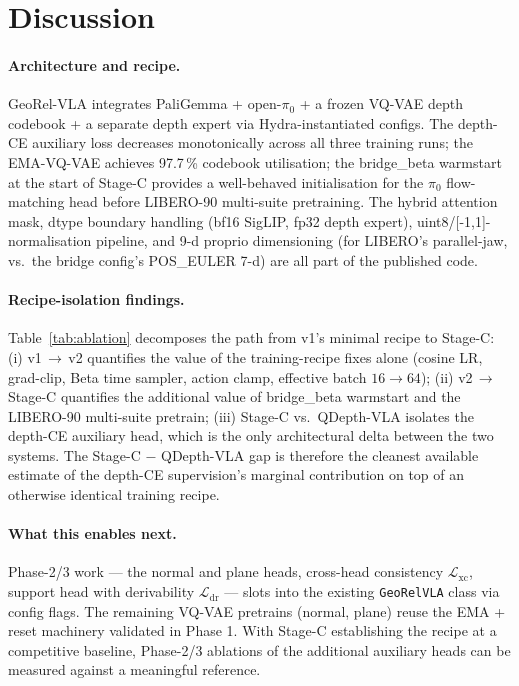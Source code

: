 \documentclass{article}
\newcommand{\Lxc}{\mathcal{L}_{\mathrm{xc}}}
\newcommand{\Ldr}{\mathcal{L}_{\mathrm{dr}}}
\begin{document}
\section{Discussion}\label{sec:discuss}

\paragraph{Architecture and recipe.} GeoRel-VLA integrates PaliGemma + open-$\pi_0$ + a frozen VQ-VAE depth codebook + a separate depth expert via Hydra-instantiated configs. The depth-CE auxiliary loss decreases monotonically across all three training runs; the EMA-VQ-VAE achieves 97.7\,\% codebook utilisation; the bridge\_beta warmstart at the start of Stage-C provides a well-behaved initialisation for the $\pi_0$ flow-matching head before LIBERO-90 multi-suite pretraining. The hybrid attention mask, dtype boundary handling (bf16 SigLIP, fp32 depth expert), uint8/[-1,1]-normalisation pipeline, and 9-d proprio dimensioning (for LIBERO's parallel-jaw, vs.\ the bridge config's POS\_EULER 7-d) are all part of the published code.

\paragraph{Recipe-isolation findings.} Table~\ref{tab:ablation} decomposes the path from v1's minimal recipe to Stage-C: (i) v1\,$\to$\,v2 quantifies the value of the training-recipe fixes alone (cosine LR, grad-clip, Beta time sampler, action clamp, effective batch $16{\to}64$); (ii) v2\,$\to$\,Stage-C quantifies the additional value of bridge\_beta warmstart and the LIBERO-90 multi-suite pretrain; (iii) Stage-C vs.\ QDepth-VLA isolates the depth-CE auxiliary head, which is the only architectural delta between the two systems. The Stage-C $-$ QDepth-VLA gap is therefore the cleanest available estimate of the depth-CE supervision's marginal contribution on top of an otherwise identical training recipe.

\paragraph{What this enables next.} Phase-2/3 work — the normal and plane heads, cross-head consistency $\Lxc$, support head with derivability $\Ldr$ — slots into the existing \texttt{GeoRelVLA} class via config flags. The remaining VQ-VAE pretrains (normal, plane) reuse the EMA + reset machinery validated in Phase 1. With Stage-C establishing the recipe at a competitive baseline, Phase-2/3 ablations of the additional auxiliary heads can be measured against a meaningful reference.
\end{document}
